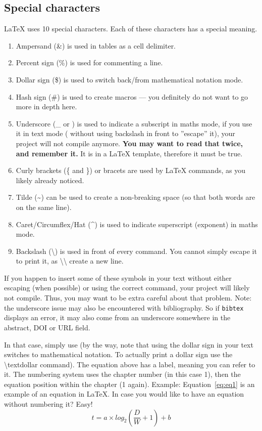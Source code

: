 \subsection{Special characters}
LaTeX uses 10 special characters. Each of these characters has a special meaning.
\begin{enumerate}
  \item Ampersand (\&) is used in tables as a cell delimiter.
  \item Percent sign (\%) is used for commenting a line.
  \item Dollar sign (\$) is used to switch back/from mathematical notation mode.
  \item Hash sign (\#) is used to create macros --- you definitely do not want to go more in depth here.
  \item Underscore (\_ or \textunderscore) is used to indicate a subscript in maths mode, if you use it in text mode ( without using backslash in front to ''escape'' it), your project will not compile anymore. \textbf{You may want to read that twice, and remember it.} It is in a LaTeX template, therefore it must be true.
  \item Curly brackets (\{ and \}) or bracets are used by LaTeX commands, as you likely already noticed.
  \item Tilde (\textasciitilde) can be used to create a non-breaking space (so that both words are on the same line).
  \item Caret/Circumflex/Hat (\textasciicircum) is used to indicate superscript (exponent) in maths mode.
  \item Backslash (\textbackslash) is used in front of every command. You cannot simply escape it to print it, as \textbackslash{}\textbackslash{} create a new line.
\end{enumerate}
If you happen to insert some of these symbols in your text without either escaping (when possible) or using the correct command, your project will likely not compile.
Thus, you may want to be extra careful about that problem.
Note: the underscore issue may also be encountered with bibliography.
So if \texttt{bibtex} displays an error, it may also come from an underscore somewhere in the abstract, DOI or URL field.


In that case, simply use \textdollar{} (by the way, note that using the dollar sign in your text switches to mathematical notation. To actually print a dollar sign use the \textbackslash{}textdollar command).
The equation above has a label, meaning you can refer to it. The numbering system uses the chapter number (in this case 1), then the equation position within the chapter (1 again).
Example: Equation~\ref{eq:eq1} is an example of an equation in LaTeX{}.
In case you would like to have an equation without numbering it? Easy!
\begin{equation*}
t = a \times log_{2}(\frac{D}{W} + 1) + b
\end{equation*}

